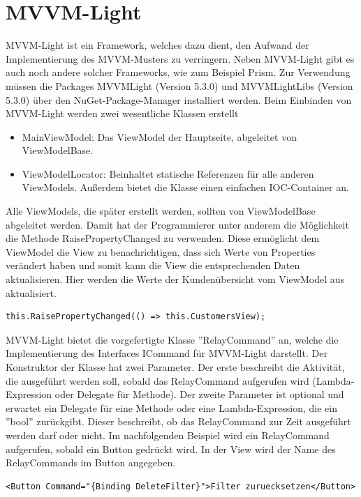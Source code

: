 \section{MVVM-Light}
MVVM-Light ist ein Framework, welches dazu dient, den Aufwand der Implementierung des MVVM-Musters zu verringern. Neben MVVM-Light gibt es auch noch andere solcher Frameworks, wie zum Beispiel Prism. Zur Verwendung müssen die Packages MVVMLight (Version 5.3.0) und MVVMLightLibs (Version 5.3.0) über den NuGet-Package-Manager installiert werden. Beim Einbinden von MVVM-Light werden zwei wesentliche Klassen erstellt
\begin{itemize}
\item MainViewModel: Das ViewModel der Hauptseite, abgeleitet von ViewModelBase.
\item ViewModelLocator: Beinhaltet statische Referenzen für alle anderen ViewModels. Außerdem bietet die Klasse einen einfachen IOC-Container an.
\end{itemize}
Alle ViewModels, die später erstellt werden, sollten von ViewModelBase abgeleitet werden. Damit hat der Programmierer unter anderem die Möglichkeit die Methode RaisePropertyChanged zu verwenden. Diese ermöglicht dem ViewModel die View zu benachrichtigen, dass sich Werte von Properties verändert haben und somit kann die View die entsprechenden Daten aktualisieren. \newline
Hier werden die Werte der Kundenübersicht vom ViewModel aus aktualisiert.
\begin{lstlisting}
this.RaisePropertyChanged(() => this.CustomersView);
\end{lstlisting}
MVVM-Light bietet die vorgefertigte Klasse ''RelayCommand'' an, welche die Implementierung des Interfaces ICommand für MVVM-Light darstellt. Der Konstruktor der Klasse hat zwei Parameter. Der erste beschreibt die Aktivität, die ausgeführt werden soll, sobald das RelayCommand aufgerufen wird (Lambda-Expression oder Delegate für Methode). Der zweite Parameter ist optional und erwartet ein Delegate für eine Methode oder eine Lambda-Expression, die ein ''bool'' zurückgibt. Dieser  beschreibt, ob das RelayCommand zur Zeit ausgeführt werden darf oder nicht.
\newline 
Im nachfolgenden Beispiel wird ein RelayCommand aufgerufen, sobald ein Button gedrückt wird.
\newline In der View wird der Name des RelayCommands im Button angegeben.
\begin{lstlisting}
<Button Command="{Binding DeleteFilter}">Filter zuruecksetzen</Button>
\end{lstlisting}
